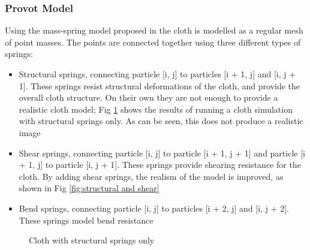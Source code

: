 \subsubsection{Provot Model}
Using the mass-spring model proposed in \textcite{Provot2001} the cloth is modelled as a regular mesh of point masses. The points are connected together using three different types of springs:
\begin{itemize}
  \item{Structural springs, connecting particle [i, j] to particles [i + 1, j] and [i, j + 1]. These springs resist structural deformations of the cloth, and provide the overall cloth structure. On their own they are not enough to provide a realistic cloth model; Fig \ref{fig:structural only} shows the results of running a cloth simulation with structural springs only. As can be seen, this does not produce a realistic image}
  \item{Shear springs, connecting particle [i, j] to particle [i + 1, j + 1] and particle [i + 1, j] to particle [i, j + 1]. These springs provide shearing resistance for the cloth. By adding shear springs, the realism of the model is improved, as shown in Fig \ref{fig:structural and shear}}
  \item{Bend springs, connecting particle [i, j] to particles [i + 2, j] and [i, j + 2]. These springs model bend resistance}
\end{itemize}

\begin{figure}
\centering
{}
\caption[Cloth with structural springs only]{Cloth with structural springs only \parencite[2]{Lander2000}}
\label{fig:structural only}
\end{figure}

